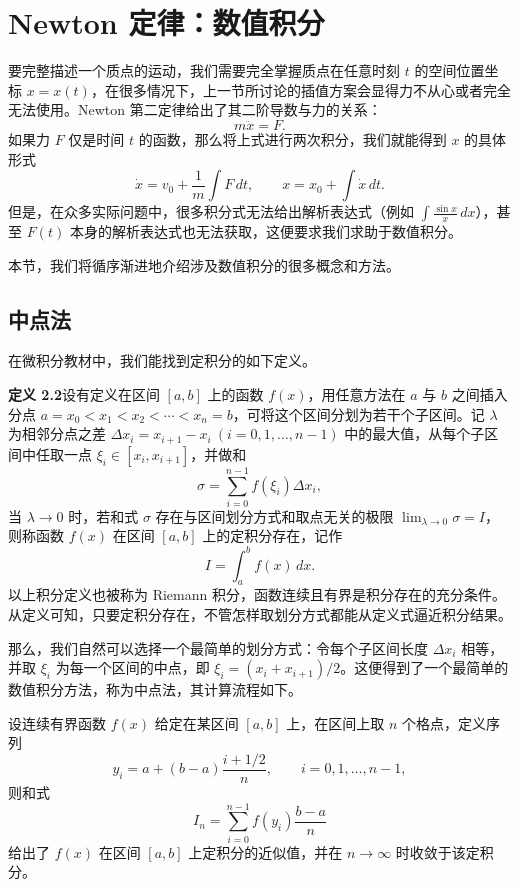 \section{Newton 定律：数值积分}

要完整描述一个质点的运动，我们需要完全掌握质点在任意时刻 $t$ 的空间位置坐标 $x=x(t)$，在很多情况下，上一节所讨论的插值方案会显得力不从心或者完全无法使用。Newton 第二定律给出了其二阶导数与力的关系：
\begin{equation}
m\ddot{x}=F.
\tag{2.2.1}
\end{equation}
如果力 $F$ 仅是时间 $t$ 的函数，那么将上式进行两次积分，我们就能得到 $x$ 的具体形式
\[
\dot{x}=v_0+\frac1m\int F\,dt,\qquad x=x_0+\int\dot{x}\,dt.
\]
但是，在众多实际问题中，很多积分式无法给出解析表达式（例如 $\int \frac{\sin x}{x}\,dx$），甚至 $F(t)$ 本身的解析表达式也无法获取，这便要求我们求助于数值积分。

本节，我们将循序渐进地介绍涉及数值积分的很多概念和方法。

\subsection{中点法}

在微积分教材中，我们能找到定积分的如下定义。

\textbf{定义 2.2}\quad 设有定义在区间 $[a,b]$ 上的函数 $f(x)$，用任意方法在 $a$ 与 $b$ 之间插入分点 $a=x_0<x_1<x_2<\cdots<x_n=b$，可将这个区间分划为若干个子区间。记 $\lambda$ 为相邻分点之差 $\Delta x_i=x_{i+1}-x_i\ (i=0,1,\ldots,n-1)$ 中的最大值，从每个子区间中任取一点 $\xi_i\in[x_i,x_{i+1}]$，并做和
\[
\sigma=\sum_{i=0}^{n-1}f(\xi_i)\Delta x_i,
\]
当 $\lambda\to0$ 时，若和式 $\sigma$ 存在与区间划分方式和取点无关的极限 $\lim_{\lambda\to0}\sigma=I$，则称函数 $f(x)$ 在区间 $[a,b]$ 上的定积分存在，记作
\[
I=\int_a^b f(x)\,dx.
\]
以上积分定义也被称为 Riemann 积分，函数连续且有界是积分存在的充分条件。从定义可知，只要定积分存在，不管怎样取划分方式都能从定义式逼近积分结果。

那么，我们自然可以选择一个最简单的划分方式：令每个子区间长度 $\Delta x_i$ 相等，并取 $\xi_i$ 为每一个区间的中点，即 $\xi_i=(x_i+x_{i+1})/2$。这便得到了一个最简单的数值积分方法，称为中点法，其计算流程如下。

\begin{algorithmBox}
设连续有界函数 $f(x)$ 给定在某区间 $[a,b]$ 上，在区间上取 $n$ 个格点，定义序列
\[
y_i=a+(b-a)\frac{i+1/2}{n},\qquad i=0,1,\ldots,n-1,
\]
则和式
\[
I_n=\sum_{i=0}^{n-1}f(y_i)\frac{b-a}{n}
\]
给出了 $f(x)$ 在区间 $[a,b]$ 上定积分的近似值，并在 $n\to\infty$ 时收敛于该定积分。
\end{algorithmBox}

